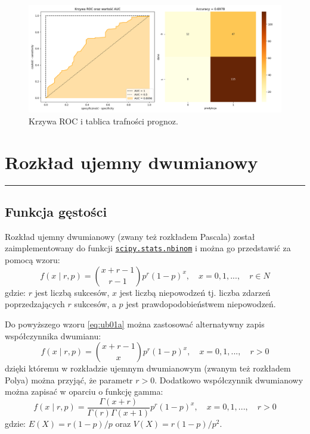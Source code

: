 \documentclass[polish,]{book}
\begin{document}
\begin{figure}[h]

{\centering \includegraphics[width=1\linewidth]{roc} 

}

\caption{Krzywa ROC i tablica trafności prognoz.}\label{fig:roc}
\end{figure}

\hypertarget{R6}{%
\chapter{Rozkład ujemny dwumianowy}\label{R6}}

\begin{center}\rule{0.5\linewidth}{\linethickness}\end{center}

\hypertarget{R61}{%
\section{Funkcja gęstości}\label{R61}}

Rozkład ujemny dwumianowy (zwany też rozkładem Pascala) został zaimplementowany do funkcji \href{https://docs.scipy.org/doc/scipy/reference/generated/scipy.stats.nbinom.html}{\texttt{scipy.stats.nbinom}} i można go przedstawić za pomocą wzoru:
\begin{equation}
f(x\;|\;r,p)={x+r-1\choose r-1}p^r(1-p)^x,\quad x=0,1,...,\quad r\in N
\label{eq:ub01a}
\end{equation}
gdzie: \(r\) jest liczbą sukcesów, \(x\) jest liczbą niepowodzeń tj. liczba zdarzeń poprzedzających \(r\) sukcesów, a \(p\) jest prawdopodobieństwem niepowodzeń.

Do powyższego wzoru \eqref{eq:ub01a} można zastosować alternatywny zapis współczynnika dwumianu:
\begin{equation}
f(x\;|\;r,p)={x+r-1\choose x}p^r(1-p)^x,\quad x=0,1,...,\quad r>0
\label{eq:ub01b}
\end{equation}
dzięki któremu w rozkładzie ujemnym dwumianowym (zwanym też rozkładem Polya) można przyjąć, że parametr \(r>0\). Dodatkowo współczynnik dwumianowy można zapisać w oparciu o funkcję gamma:
\begin{equation}
f(x\;|\;r,p)=\frac{\Gamma(x+r)}{\Gamma(r)\Gamma(x+1)}p^r(1-p)^x,\quad x=0,1,...,\quad r>0
\label{eq:ub02}
\end{equation}
gdzie: \(E(X)=r(1-p)/p\) oraz \(V(X)=r(1-p)/p^2\).
\end{document}
